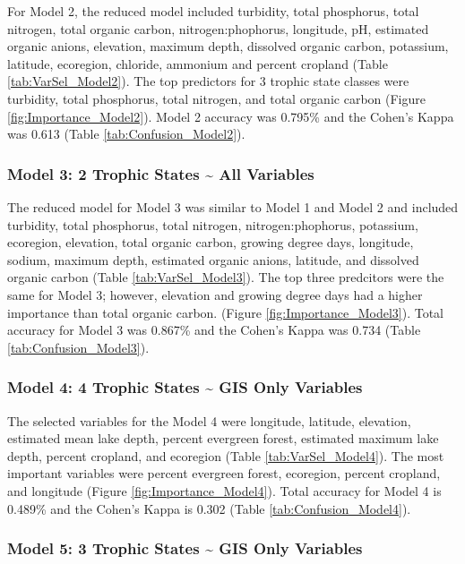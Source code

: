 \documentclass[11pt,]{article}
\begin{document}
For Model 2, the reduced model included turbidity, total phosphorus,
total nitrogen, total organic carbon, nitrogen:phophorus, longitude, pH,
estimated organic anions, elevation, maximum depth, dissolved organic
carbon, potassium, latitude, ecoregion, chloride, ammonium and percent
cropland (Table \ref{tab:VarSel_Model2}). The top predictors for 3
trophic state classes were turbidity, total phosphorus, total nitrogen,
and total organic carbon (Figure \ref{fig:Importance_Model2}). Model 2
accuracy was 0.795\% and the Cohen's Kappa was 0.613 (Table
\ref{tab:Confusion_Model2}).

\subsubsection{Model 3: 2 Trophic States \textasciitilde{} All
Variables}\label{model-3-2-trophic-states-all-variables}

The reduced model for Model 3 was similar to Model 1 and Model 2 and
included turbidity, total phosphorus, total nitrogen,
nitrogen:phophorus, potassium, ecoregion, elevation, total organic
carbon, growing degree days, longitude, sodium, maximum depth, estimated
organic anions, latitude, and dissolved organic carbon (Table
\ref{tab:VarSel_Model3}). The top three predcitors were the same for
Model 3; however, elevation and growing degree days had a higher
importance than total organic carbon. (Figure
\ref{fig:Importance_Model3}). Total accuracy for Model 3 was 0.867\% and
the Cohen's Kappa was 0.734 (Table \ref{tab:Confusion_Model3}).

\subsubsection{Model 4: 4 Trophic States \textasciitilde{} GIS Only
Variables}\label{model-4-4-trophic-states-gis-only-variables}

The selected variables for the Model 4 were longitude, latitude,
elevation, estimated mean lake depth, percent evergreen forest,
estimated maximum lake depth, percent cropland, and ecoregion (Table
\ref{tab:VarSel_Model4}). The most important variables were percent
evergreen forest, ecoregion, percent cropland, and longitude (Figure
\ref{fig:Importance_Model4}). Total accuracy for Model 4 is 0.489\% and
the Cohen's Kappa is 0.302 (Table \ref{tab:Confusion_Model4}).

\subsubsection{Model 5: 3 Trophic States \textasciitilde{} GIS Only
Variables}\label{model-5-3-trophic-states-gis-only-variables}
\end{document}
